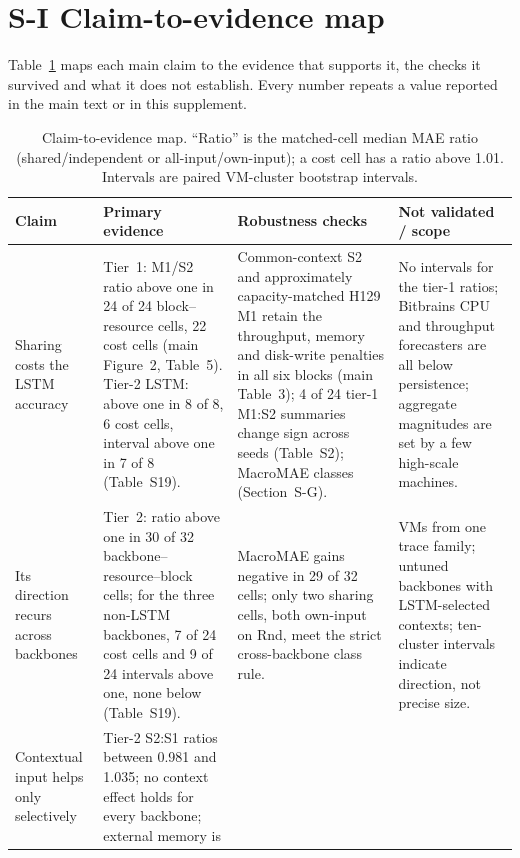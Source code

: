 \clearpage
\section*{S-I Claim-to-evidence map}
\label{sec:s-i}
Table~\ref{tab:claim-evidence} maps each main claim to the evidence that supports it, the checks it survived and
what it does not establish. Every number repeats a value reported in the main text or in this supplement.

\begin{table}[h]\footnotesize
\centering
\caption{Claim-to-evidence map. ``Ratio'' is the matched-cell median MAE ratio (shared/independent or
all-input/own-input); a cost cell has a ratio above 1.01. Intervals are paired VM-cluster bootstrap intervals.}
\label{tab:claim-evidence}
\setlength{\tabcolsep}{3pt}
\renewcommand{\arraystretch}{1.15}
\begin{tabular}{@{}>{\raggedright\arraybackslash}p{}
  >{\raggedright\arraybackslash}p{}
  >{\raggedright\arraybackslash}p{}
  >{\raggedright\arraybackslash}p{}@{}}
\toprule
Claim & Primary evidence & Robustness checks & Not validated / scope \\
\midrule
Sharing costs the LSTM accuracy
  & Tier~1: M1/S2 ratio above one in 24 of 24 block--resource cells, 22 cost cells (main Figure~2, Table~5).
    Tier-2 LSTM: above one in 8 of 8, 6 cost cells, interval above one in 7 of 8 (Table~S19).
  & Common-context S2 and approximately capacity-matched H129 M1 retain the throughput, memory and disk-write penalties in all
    six blocks (main Table~3); 4 of 24 tier-1 M1:S2 summaries change sign across seeds (Table~S2); MacroMAE
    classes (Section~S-G).
  & No intervals for the tier-1 ratios; Bitbrains CPU and throughput forecasters are all below persistence;
    aggregate magnitudes are set by a few high-scale machines. \\
\addlinespace
Its direction recurs across backbones
  & Tier~2: ratio above one in 30 of 32 backbone--resource--block cells; for the three non-LSTM backbones,
    7 of 24 cost cells and 9 of 24 intervals above one, none below (Table~S19).
  & MacroMAE gains negative in 29 of 32 cells; only two sharing cells, both own-input on Rnd, meet the strict cross-backbone class rule.
  & 20 VMs from one trace family; untuned backbones with LSTM-selected contexts; ten-cluster intervals indicate
    direction, not precise size. \\
\addlinespace
Contextual input helps only selectively
  & Tier-2 S2:S1 ratios between 0.981 and 1.035; no context effect holds for every backbone; external memory is

\end{tabular}
\end{table}
